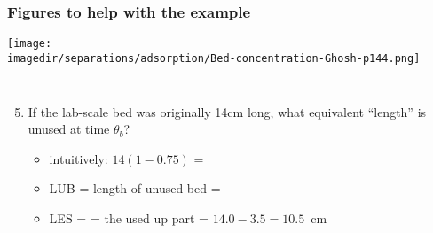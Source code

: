 \begin{frame}\frametitle{Figures to help with the example}
	\begin{center}
		\texttt{[image: \\imagedir/separations/adsorption/Bed-concentration-Ghosh-p144.png]}
	\end{center}
	\vspace{-16pt}
	\begin{columns}[t]
		\begin{enumerate}
			\setcounter{enumi}{4}
			\item	If the lab-scale bed was originally 14cm long, what equivalent ``length'' is unused at time $\theta_b$?
				\begin{itemize}
					\item	intuitively: $14(1 - 0.75)$ = {\color{myOrange}{3.5 cm}}
					\item	LUB = length of unused bed = {\color{myOrange}{3.5 cm}}
					\item	LES = {\color{purple}{length of equilibrium section}} = the used up part = $14.0 - 3.5 = 10.5$~cm
				\end{itemize}
		\end{enumerate}
	\end{columns}
\end{frame}

